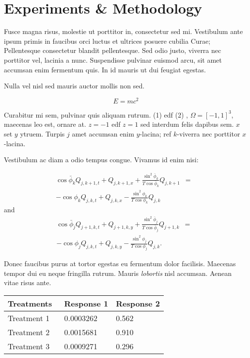 \documentclass{article}
\begin{document}
\section{Experiments \& Methodology}

Fusce magna risus, molestie ut porttitor in, consectetur sed
mi. Vestibulum ante ipsum primis in faucibus orci luctus et ultrices
posuere cubilia Curae; Pellentesque consectetur blandit
pellentesque. Sed odio justo, viverra nec porttitor vel, lacinia a
nunc. Suspendisse pulvinar euismod arcu, sit amet accumsan enim
fermentum quis. In id mauris ut dui feugiat egestas. 


Nulla vel nisl sed mauris auctor mollis non sed. 

\begin{equation}
E = mc^{2}
\label{eqn:Einstein}
\end{equation}

Curabitur mi sem, pulvinar quis aliquam rutrum. (1) edf (2) ,
$\Omega=[-1,1]^3$, maecenas leo est, ornare at. $z=-1$ edf $z=1$ sed
interdum felis dapibus sem. $x$ set $y$ ytruem.  Turpis $j$ amet
accumsan enim $y$-lacina; ref $k$-viverra nec porttitor $x$-lacina.

Vestibulum ac diam a odio tempus congue. Vivamus id enim nisi:

\begin{eqnarray}
\cos\bar{\phi}_k Q_{j,k+1,t} + Q_{j,k+1,x}+\frac{\sin^2\bar{\phi}_k}{T\cos\bar{\phi}_k} Q_{j,k+1} &=&\nonumber\\ 
-\cos\phi_k Q_{j,k,t} + Q_{j,k,x}-\frac{\sin^2\phi_k}{T\cos\phi_k} Q_{j,k}\label{edgek}
\end{eqnarray}
and
\begin{eqnarray}
\cos\bar{\phi}_j Q_{j+1,k,t} + Q_{j+1,k,y}+\frac{\sin^2\bar{\phi}_j}{T\cos\bar{\phi}_j} Q_{j+1,k}&=&\nonumber \\
-\cos\phi_j Q_{j,k,t} + Q_{j,k,y}-\frac{\sin^2\phi_j}{T\cos\phi_j} Q_{j,k}.\label{edgej}
\end{eqnarray} 

Donec faucibus purus at tortor egestas eu fermentum dolor
facilisis. Maecenas tempor dui eu neque fringilla rutrum. Mauris
\emph{lobortis} nisl accumsan. Aenean vitae risus ante.
%

\vspace{1cm}
\begin{center}
\begin{tabular}{l l l}
\toprule
\textbf{Treatments}~ & \textbf{Response 1} & \textbf{Response 2}\\
\midrule
Treatment 1 & 0.0003262 & 0.562 \\
Treatment 2 & 0.0015681 & 0.910 \\
Treatment 3 & 0.0009271 & 0.296 \\
\bottomrule
\end{tabular}
\end{center}
\vspace{1cm}
\end{document}
